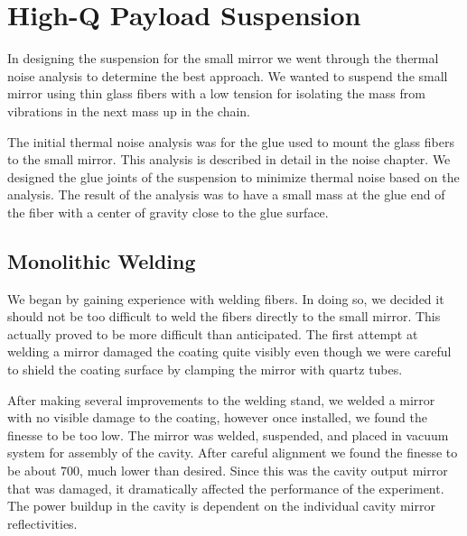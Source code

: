 
\section{High-Q Payload Suspension}

In designing the suspension for the small mirror we went through the thermal
noise analysis to determine the best approach. We wanted to suspend the small
mirror using thin glass fibers with a low tension for isolating the mass from
vibrations in the next mass up in the chain.

The initial thermal noise analysis was for the glue used to mount the glass
fibers to the small mirror. This analysis is described in detail in the
noise chapter. We designed the glue joints of the suspension to minimize
thermal noise based on the analysis. The result of the analysis was to have a
small mass at the glue end of the fiber with a center of gravity close to the
glue surface.

\subsection{Monolithic Welding}

We began by gaining experience with welding fibers. In doing so, we decided it
should not be too difficult to weld the fibers directly to the small mirror.
This actually proved to be more difficult than anticipated.
The first attempt at welding a mirror damaged the coating quite visibly even
though we were careful to shield the coating surface by clamping the mirror
with quartz tubes.

After making several improvements to the welding stand, we welded a mirror
with no visible damage to the coating, however once installed, we found the
finesse to be too low.
The mirror was welded, suspended, and placed in vacuum system
for assembly of the cavity.
After careful alignment we found the finesse to be about 700, much lower than
desired.
Since this was the cavity output mirror that was damaged, it dramatically
affected the performance of the experiment.
The power buildup in the cavity is dependent on the
individual cavity mirror reflectivities.


